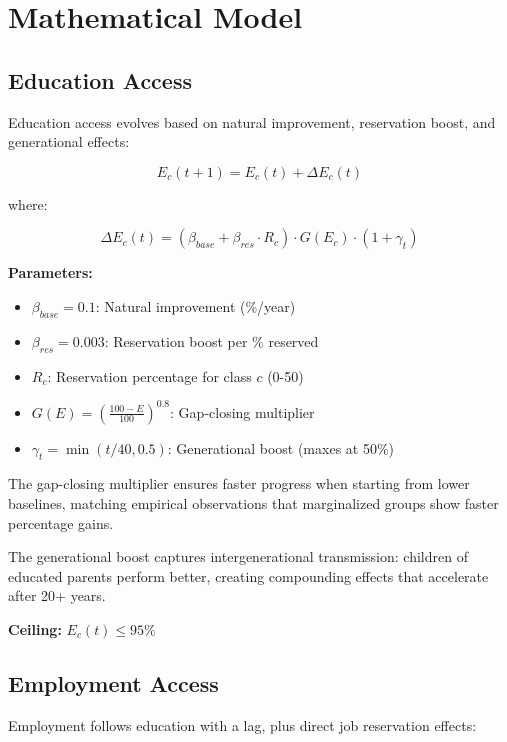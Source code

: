 \documentclass[10pt,twocolumn]{article}
\begin{document}
\section{Mathematical Model}

\subsection{Education Access}

Education access evolves based on natural improvement, reservation boost, and generational effects:

\begin{equation}
E_c(t+1) = E_c(t) + \Delta E_c(t)
\end{equation}

where:

\begin{equation}
\Delta E_c(t) = (\beta_{base} + \beta_{res} \cdot R_c) \cdot G(E_c) \cdot (1 + \gamma_t)
\end{equation}

\textbf{Parameters:}
\begin{itemize}
    \item $\beta_{base} = 0.1$: Natural improvement (\%/year)
    \item $\beta_{res} = 0.003$: Reservation boost per \% reserved
    \item $R_c$: Reservation percentage for class $c$ (0-50)
    \item $G(E) = \left(\frac{100 - E}{100}\right)^{0.8}$: Gap-closing multiplier
    \item $\gamma_t = \min(t/40, 0.5)$: Generational boost (maxes at 50\%)
\end{itemize}

The gap-closing multiplier ensures faster progress when starting from lower baselines, matching empirical observations that marginalized groups show faster percentage gains.

The generational boost captures intergenerational transmission: children of educated parents perform better, creating compounding effects that accelerate after 20+ years.

\textbf{Ceiling:} $E_c(t) \leq 95\%$

\subsection{Employment Access}

Employment follows education with a lag, plus direct job reservation effects:
\end{document}
